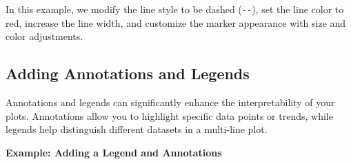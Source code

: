 \documentclass[
  letterpaper,
  DIV=11,
  numbers=noendperiod]{scrreprt}
\begin{document}
In this example, we modify the line style to be dashed (\texttt{-\/-}),
set the line color to red, increase the line width, and customize the
marker appearance with size and color adjustments.

\hypertarget{adding-annotations-and-legends}{%
\subsection{Adding Annotations and
Legends}\label{adding-annotations-and-legends}}

Annotations and legends can significantly enhance the interpretability
of your plots. Annotations allow you to highlight specific data points
or trends, while legends help distinguish different datasets in a
multi-line plot.

\textbf{Example: Adding a Legend and Annotations}
\end{document}
